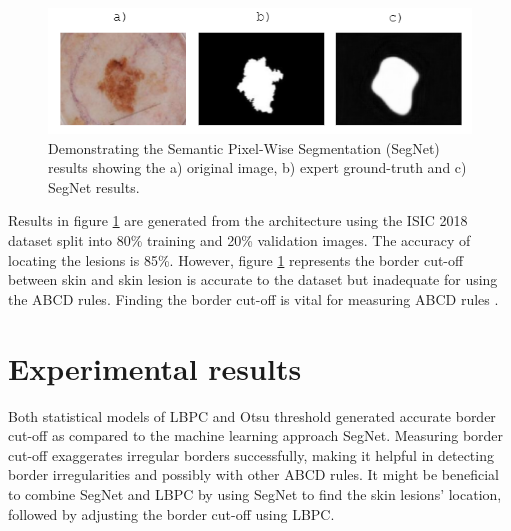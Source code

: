 \begin{figure}[hb]
\centering
\includegraphics[scale=1.2]{images/border-seg.png}
\caption{Demonstrating the Semantic Pixel-Wise Segmentation (SegNet) results showing the a) original image, b) expert ground-truth and c) SegNet results.} \label{SegNet2}
\end{figure}

Results in figure \ref{SegNet2} are generated from the architecture using the ISIC 2018 dataset split into 80\% training and 20\% validation images. The accuracy of locating the lesions is 85\%. However, figure \ref{SegNet2} represents the border cut-off between skin and skin lesion is accurate to the dataset but inadequate for using the ABCD rules. Finding the border cut-off is vital for measuring ABCD rules \cite{Pereira2020}.

\section{Experimental results}
Both statistical models of LBPC and Otsu threshold generated accurate border cut-off as compared to the machine learning approach SegNet. Measuring border cut-off exaggerates irregular borders successfully, making it helpful in detecting border irregularities and possibly with other ABCD rules. It might be beneficial to combine SegNet and LBPC by using SegNet to find the skin lesions' location, followed by adjusting the border cut-off using LBPC.



